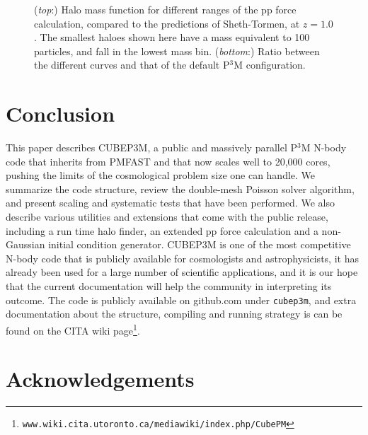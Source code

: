 \documentclass[useAMS,usenatbib]{mn2e}
\begin{document}
\begin{figure}
  \begin{center}
  \caption{ ({\it top}:) Halo mass function for different ranges of the pp force calculation, compared to the predictions of Sheth-Tormen, at $z = 1.0$. 
  The smallest haloes shown here have a mass equivalent to 100 particles, and fall in the lowest mass bin.
  ({\it bottom}:) Ratio between the different curves and that of the default P$^3$M configuration.}
    \label{fig:MassFunction_extpp}
  \end{center}
\end{figure}


%

\section{Conclusion}

This paper describes {\small CUBEP3M}, a public and  massively parallel P$^3$M N-body code that inherits from {\small PMFAST} 
 and that now scales well to 20,000 cores, pushing the limits of the cosmological problem size one can handle.
We summarize the code structure, review the double-mesh Poisson solver algorithm, and present scaling and systematic tests
that have been performed. We also describe various utilities and extensions that come with the public release, 
including a run time halo finder, an extended pp force calculation and a non-Gaussian initial condition generator.
{\small CUBEP3M} is one of the most competitive N-body code that is publicly available for cosmologists and astrophysicists,
it has already been used  for a large number of scientific applications, and it is our hope that the current documentation will 
help the community in interpreting its outcome.
The code is publicly available on github.com under {\tt cubep3m}, and extra documentation about the structure, 
compiling and running strategy is can be found on the CITA wiki page\footnote{\tt www.wiki.cita.utoronto.ca/mediawiki/index.php/CubePM}.

\section*{Acknowledgements}
\end{document}
